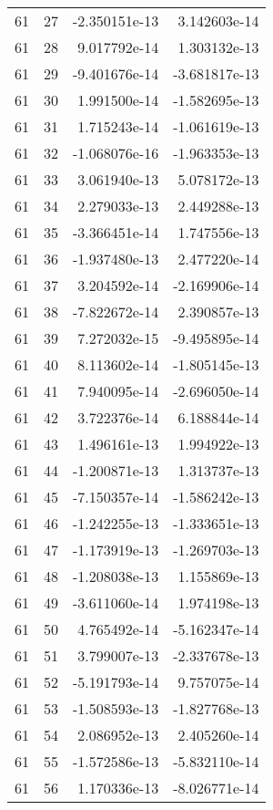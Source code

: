 \begin{tabular}{rrrr}
  61 &   27 & -2.350151e-13 &  3.142603e-14 \\
  61 &   28 &  9.017792e-14 &  1.303132e-13 \\
  61 &   29 & -9.401676e-14 & -3.681817e-13 \\
  61 &   30 &  1.991500e-14 & -1.582695e-13 \\
  61 &   31 &  1.715243e-14 & -1.061619e-13 \\
  61 &   32 & -1.068076e-16 & -1.963353e-13 \\
  61 &   33 &  3.061940e-13 &  5.078172e-13 \\
  61 &   34 &  2.279033e-13 &  2.449288e-13 \\
  61 &   35 & -3.366451e-14 &  1.747556e-13 \\
  61 &   36 & -1.937480e-13 &  2.477220e-14 \\
  61 &   37 &  3.204592e-14 & -2.169906e-14 \\
  61 &   38 & -7.822672e-14 &  2.390857e-13 \\
  61 &   39 &  7.272032e-15 & -9.495895e-14 \\
  61 &   40 &  8.113602e-14 & -1.805145e-13 \\
  61 &   41 &  7.940095e-14 & -2.696050e-14 \\
  61 &   42 &  3.722376e-14 &  6.188844e-14 \\
  61 &   43 &  1.496161e-13 &  1.994922e-13 \\
  61 &   44 & -1.200871e-13 &  1.313737e-13 \\
  61 &   45 & -7.150357e-14 & -1.586242e-13 \\
  61 &   46 & -1.242255e-13 & -1.333651e-13 \\
  61 &   47 & -1.173919e-13 & -1.269703e-13 \\
  61 &   48 & -1.208038e-13 &  1.155869e-13 \\
  61 &   49 & -3.611060e-14 &  1.974198e-13 \\
  61 &   50 &  4.765492e-14 & -5.162347e-14 \\
  61 &   51 &  3.799007e-13 & -2.337678e-13 \\
  61 &   52 & -5.191793e-14 &  9.757075e-14 \\
  61 &   53 & -1.508593e-13 & -1.827768e-13 \\
  61 &   54 &  2.086952e-13 &  2.405260e-14 \\
  61 &   55 & -1.572586e-13 & -5.832110e-14 \\
  61 &   56 &  1.170336e-13 & -8.026771e-14 \\

\end{tabular}
